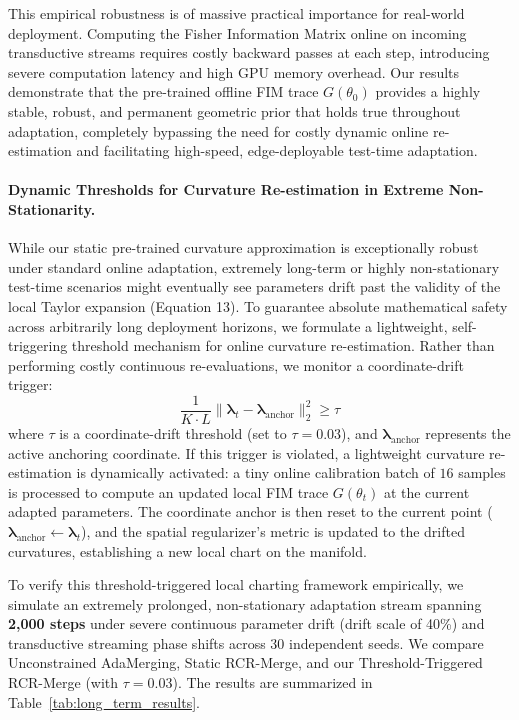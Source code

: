 This empirical robustness is of massive practical importance for real-world deployment. Computing the Fisher Information Matrix online on incoming transductive streams requires costly backward passes at each step, introducing severe computation latency and high GPU memory overhead. Our results demonstrate that the pre-trained offline FIM trace $G(\theta_0)$ provides a highly stable, robust, and permanent geometric prior that holds true throughout adaptation, completely bypassing the need for costly dynamic online re-estimation and facilitating high-speed, edge-deployable test-time adaptation.

\paragraph{Dynamic Thresholds for Curvature Re-estimation in Extreme Non-Stationarity.} While our static pre-trained curvature approximation is exceptionally robust under standard online adaptation, extremely long-term or highly non-stationary test-time scenarios might eventually see parameters drift past the validity of the local Taylor expansion (Equation 13). To guarantee absolute mathematical safety across arbitrarily long deployment horizons, we formulate a lightweight, self-triggering threshold mechanism for online curvature re-estimation. Rather than performing costly continuous re-evaluations, we monitor a coordinate-drift trigger:
\begin{equation}
\frac{1}{K \cdot L} \|\boldsymbol{\lambda}_t - \boldsymbol{\lambda}_{\text{anchor}}\|_2^2 \ge \tau
\end{equation}
where $\tau$ is a coordinate-drift threshold (set to $\tau = 0.03$), and $\boldsymbol{\lambda}_{\text{anchor}}$ represents the active anchoring coordinate. If this trigger is violated, a lightweight curvature re-estimation is dynamically activated: a tiny online calibration batch of $16$ samples is processed to compute an updated local FIM trace $G(\theta_t)$ at the current adapted parameters. The coordinate anchor is then reset to the current point ($\boldsymbol{\lambda}_{\text{anchor}} \gets \boldsymbol{\lambda}_t$), and the spatial regularizer's metric is updated to the drifted curvatures, establishing a new local chart on the manifold.

To verify this threshold-triggered local charting framework empirically, we simulate an extremely prolonged, non-stationary adaptation stream spanning \textbf{2,000 steps} under severe continuous parameter drift (drift scale of 40\%) and transductive streaming phase shifts across 30 independent seeds. We compare Unconstrained AdaMerging, Static RCR-Merge, and our Threshold-Triggered RCR-Merge (with $\tau=0.03$). The results are summarized in Table~\ref{tab:long_term_results}.

